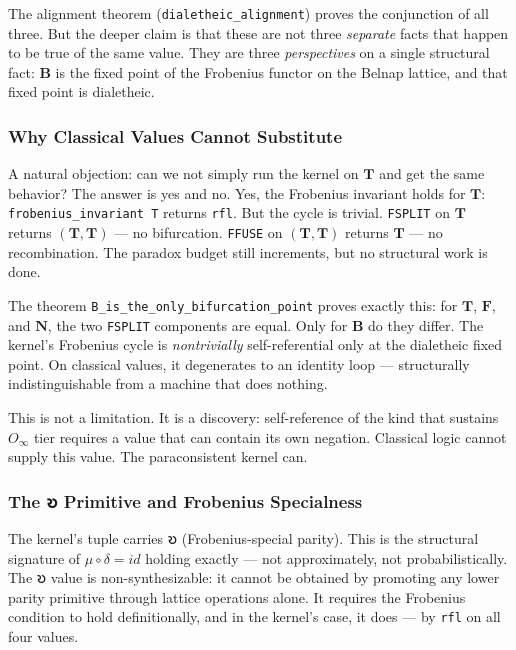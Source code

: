 \documentclass[10pt,a4paper]{article}
\begin{document}
The alignment theorem (\texttt{dialetheic\_\allowbreak alignment}) proves the conjunction of all three. But the deeper claim is that these are not three \emph{separate} facts that happen to be true of the same value. They are three \emph{perspectives} on a single structural fact: $\mathbf{B}$ is the fixed point of the Frobenius functor on the Belnap lattice, and that fixed point is dialetheic.

\subsubsection{Why Classical Values Cannot Substitute}

A natural objection: can we not simply run the kernel on $\mathbf{T}$ and get the same behavior? The answer is yes and no. Yes, the Frobenius invariant holds for $\mathbf{T}$: \texttt{frobenius\_\allowbreak invariant T} returns \texttt{rfl}. But the cycle is trivial. \texttt{FSPLIT}  on $\mathbf{T}$ returns $(\mathbf{T}, \mathbf{T})$ --- no bifurcation. \texttt{FFUSE} on $(\mathbf{T}, \mathbf{T})$ returns $\mathbf{T}$ --- no recombination. The paradox budget still increments, but no structural work is done.

The theorem \texttt{B\_\allowbreak is\_\allowbreak the\_\allowbreak only\_\allowbreak bifurcation\_\allowbreak point} proves exactly this: for $\mathbf{T}$, $\mathbf{F}$, and $\mathbf{N}$, the two \texttt{FSPLIT}  components are equal. Only for $\mathbf{B}$ do they differ. The kernel's Frobenius cycle is \emph{nontrivially} self-referential only at the dialetheic fixed point. On classical values, it degenerates to an identity loop --- structurally indistinguishable from a machine that does nothing.

This is not a limitation. It is a discovery: self-reference of the kind that sustains $O_{\infty}$ tier requires a value that can contain its own negation. Classical logic cannot supply this value. The paraconsistent kernel can.

\subsubsection{The 𐑹 Primitive and Frobenius Specialness}

The kernel's tuple carries 𐑹 (Frobenius-special parity). This is the structural signature of $\mu\circ\delta = id$ holding exactly --- not approximately, not probabilistically. The 𐑹 value is non-synthesizable: it cannot be obtained by promoting any lower parity primitive through lattice operations alone. It requires the Frobenius condition to hold definitionally, and in the kernel's case, it does --- by \texttt{rfl} on all four values.
\end{document}
